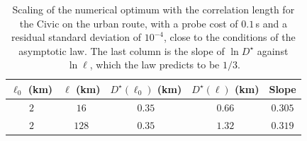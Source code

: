 \begin{table}[htbp]
\centering\small
\caption{Scaling of the numerical optimum with the correlation length for the Civic on the urban route, with a probe cost of $0.1$\,s and a residual standard deviation of $10^{-4}$, close to the conditions of the asymptotic law. The last column is the slope of $\ln D^\star$ against $\ln\ell$, which the law predicts to be $1/3$.}\label{tab:app-scaling}
\begin{tabular}{ccccc}
\toprule
$\ell_0$ (km) & $\ell$ (km) & $D^\star(\ell_0)$ (km) & $D^\star(\ell)$ (km) & Slope\\
\midrule
$2$ & $16$ & $0.35$ & $0.66$ & $0.305$\\
$2$ & $128$ & $0.35$ & $1.32$ & $0.319$\\
\bottomrule
\end{tabular}
\end{table}
